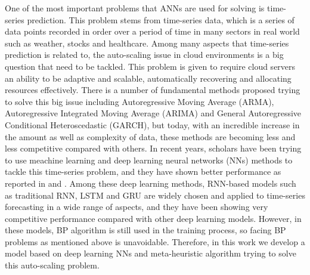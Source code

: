 \documentclass[../main.tex]{subfiles}
\begin{document}
	One of the most important problems that ANNs are used for solving is time-series prediction. This problem stems from time-series data, which is a series of data points recorded in order over a period of time in many sectors in real world such as weather, stocks and healthcare. Among many aspects that time-series prediction is related to, the auto-scaling issue in cloud environments is a big question that need to be tackled. This problem is given to  require cloud servers an ability to be adaptive and scalable, automatically recovering and allocating resources effectively. There is a number of fundamental methods proposed trying to solve this big issue including Autoregressive Moving Average (ARMA), Autoregressive Integrated Moving Average (ARIMA) and General Autoregressive Conditional
Heteroscedastic (GARCH), but today, with an incredible increase in the amount as well as complexity of data, these methods are becoming less and less competitive compared with others. In recent years, scholars have been trying to use meachine learning and deep learning neural networks (NNs) methods to tackle this time-series problem, and they have shown better performance as reported in \cite{nikravesh2015towards} and \cite{lorido2012auto}. Among these deep learning methods, RNN-based models such as traditional RNN, LSTM and GRU are widely chosen and applied to time-series forecasting in a wide range of aspects, and they have been showing very competitive performance compared with other deep learning models. However, in these models, BP algorithm is still used in the training process, so facing BP problems as mentioned above is unavoidable. Therefore, in this work we develop a model based on deep learning NNs and meta-heuristic algorithm trying to solve this auto-scaling problem.  
	
\end{document}
